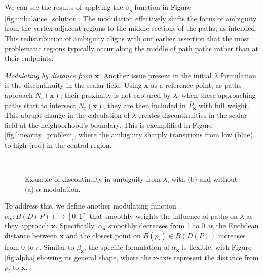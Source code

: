 We can see the results of applying the $\beta_p$ function in Figure \ref{fig:imbalance_solution}. The modulation effectively shifts the focus of ambiguity from the vertex-adjacent regions to the middle sections of the paths, as intended. This redistribution of ambiguity aligns with our earlier assertion that the most problematic regions typically occur along the middle of path paths rather than at their endpoints.


\emph{Modulating by distance from $\mathbf{x}$}:
Another issue present in the initial $\lambda$ formulation is the discontinuity in the scalar field. Using $\mathbf{x}$ as a reference point, as paths approach $N_r(\mathbf{x})$, their proximity is not captured by $\lambda$; when these approaching paths start to intersect $N_r(\mathbf{x})$, they are then included in $\bar{P}_{\mathbf{x}}$ with full weight. This abrupt change in the calculation of $\lambda$ creates discontinuities in the scalar field at the neighborhood's boundary. This is exemplified in Figure \ref{fig:linearity_problem}, where the ambiguity sharply transitions from low (blue) to high (red) in the central region.

\begin{figure}[ht]
\centering
{}
\\
\caption{Example of discontinuity in ambiguity from $\lambda$, with (b) and without (a) $\alpha$ modulation.}
\end{figure}

To address this, we define another modulating function $\alpha_{\mathbf{x}} : B(D(P)) \rightarrow [0,1]$ that smoothly weights the influence of paths on $\lambda$ as they approach $\mathbf{x}$. Specifically, $\alpha_{\mathbf{x}}$ smoothly decreases from 1 to 0 as the Euclidean distance between $\mathbf{x}$ and the closest point on $B(p_i) \in B(D(P))$ increases from 0 to $r$. Similar to $\beta_{\mathbf{x}}$, the specific formulation of $\alpha_{\mathbf{x}}$ is flexible, with Figure \ref{fig:alpha} showing its general shape, where the x-axis represent the distance from $p_i$ to $\mathbf{x}$.

